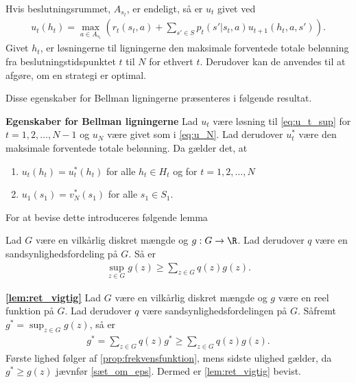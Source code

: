 Hvis beslutningsrummet, $A_{s_t}$, er endeligt, så er $u_t$ givet ved
\begin{align}\label{eq:u_t_max}
   u_t(h_t)=\max_{a\in A_{s_t}}\left(r_t(s_t, a)+\sum_{s'\in S}p_t(s'|s_t, a)u_{t+1}(h_t, a, s')\right).
\end{align}
Givet $h_t$, er løsningerne til ligningerne den maksimale forventede totale belønning fra beslutningstidspunktet $t$ til $N$ for ethvert $t$. Derudover kan de anvendes til at afgøre, om en strategi er optimal. 

Disse egenskaber for Bellman ligningerne præsenteres i følgende resultat.

\begin{minipage}\textwidth
\begin{thmx} \textbf{Egenskaber for Bellman ligningerne} \label{sæt:ret_så_vigtig}%
\newline
Lad $u_t$ være løsning til \eqref{eq:u_t_sup} for $t = 1, 2, \ldots, N-1$ og $u_N$ være givet som i \eqref{eq:u_N}. Lad derudover $u_t^*$ være den maksimale forventede totale belønning. Da gælder det, at
\begin{enumerate}
    \item $u_t(h_t)=u_t^*(h_t)$ for alle $h_t\in H_t$ og for $t=1, 2,\ldots, N$
    \item $u_1(s_1)=v_N^*(s_1)$ for alle $s_1\in S_1$.
\end{enumerate}
\end{thmx}
\end{minipage}

For at bevise dette introduceres følgende lemma 

\begin{minipage}\textwidth
\begin{lem} \label{lem:ret_vigtig}\textbf{} %
\newline
Lad $G$ være en vilkårlig diskret mængde og $g: G\to \R$. Lad derudover $q$ være en sandsynlighedsfordeling på $G$. Så er
\begin{align*}
    \sup_{z\in G}g(z)\geq \sum_{z\in G}q(z) g(z).
\end{align*}
\end{lem}
\end{minipage}

\begin{bev} \textbf{\autoref{lem:ret_vigtig}} %
\newline
Lad $G$ være en vilkårlig diskret mængde og $g$ være en reel funktion på $G$. Lad derudover $q$ være sandsynlighedsfordelingen på $G$. Såfremt $\displaystyle g^*=\sup_{z\in G}g(z)$, så er 
\begin{align*}
    g^* = \sum_{z \in G} q(z)g^* \geq \sum_{z \in G} q(z)g(z).
\end{align*}
Første lighed følger af \autoref{prop:frekvensfunktion}, mens sidste ulighed gælder, da $g^* \geq g(z)$ jævnfør \autoref{sæt_om_eps}. Dermed er \autoref{lem:ret_vigtig} bevist.
\end{bev}

